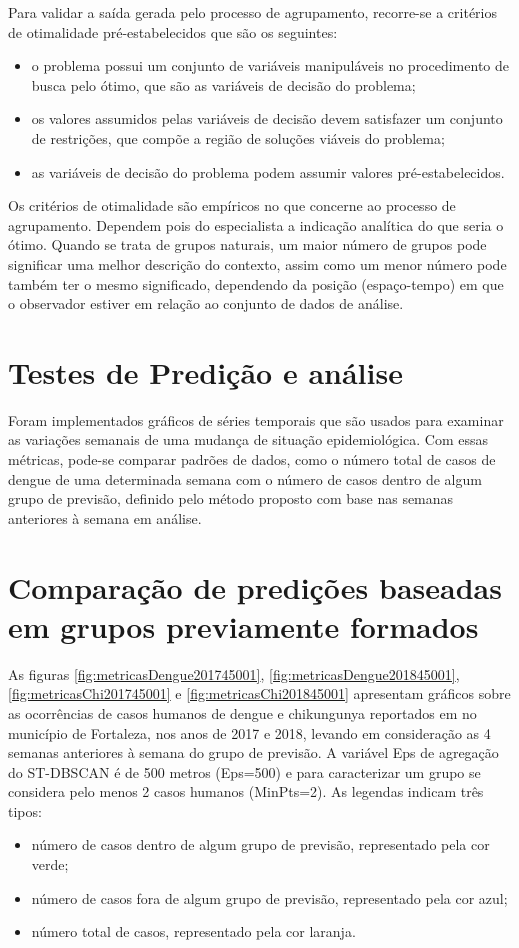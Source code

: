 Para validar a saída gerada pelo processo de agrupamento, recorre-se a critérios de otimalidade pré-estabelecidos que são os seguintes:
\begin{itemize}
    \item o problema possui um conjunto de variáveis manipuláveis no procedimento de busca pelo ótimo, que são as variáveis de decisão do problema;
    \item os valores assumidos pelas variáveis de decisão devem satisfazer um conjunto de restrições, que compõe a região de soluções viáveis do problema;
    \item as variáveis de decisão do problema podem assumir valores pré-estabelecidos.
\end{itemize}

Os critérios de otimalidade são empíricos no que concerne ao processo de agrupamento. Dependem pois do especialista a indicação analítica do que seria o ótimo. Quando se trata de grupos naturais, um maior número de grupos pode significar uma melhor descrição do contexto, assim como um menor número pode também ter o mesmo significado, dependendo da posição (espaço-tempo) em que o observador estiver em relação ao conjunto de dados de análise.

\section{Testes de Predição e análise}

Foram implementados gráficos de séries temporais que são usados para examinar as variações semanais de uma mudança de situação epidemiológica. Com essas métricas, pode-se comparar padrões de dados, como o número total de casos de dengue de uma determinada semana com o número de casos dentro de algum grupo de previsão, definido pelo método proposto com base nas semanas anteriores à semana em análise.

\section{Comparação de predições baseadas em grupos previamente formados}

As figuras \ref{fig:metricasDengue201745001}, \ref{fig:metricasDengue201845001}, \ref{fig:metricasChi201745001} e \ref{fig:metricasChi201845001} apresentam gráficos sobre as ocorrências de casos humanos de dengue e chikungunya reportados em  no município de Fortaleza, nos anos de 2017 e 2018, levando em consideração as 4 semanas anteriores à semana do grupo de previsão. A variável Eps de agregação do \acrshort{ST-DBSCAN} é de 500 metros (Eps=500) e para caracterizar um grupo se considera pelo menos 2 casos humanos (MinPts=2).
As legendas indicam três tipos:
\begin{itemize}
    \item número de casos dentro de algum grupo de previsão, representado pela cor verde;
    \item número de casos fora de algum grupo de previsão, representado pela cor azul;
    \item número total de casos, representado pela cor laranja.
\end{itemize}

